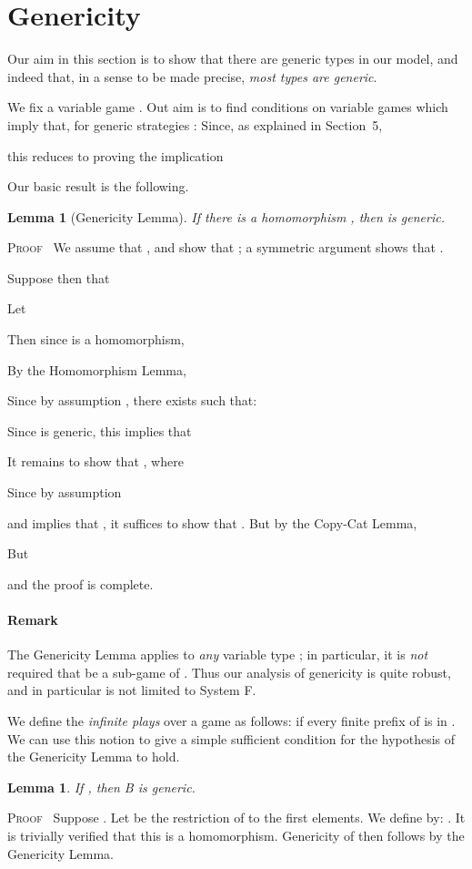 \documentclass[a4paper,11pt]{article}
\newtheorem{lemma}[proposition]{Lemma}
\newenvironment{proof}{\textsc{Proof}\ }{}
\begin{document}
\section{Genericity}

Our aim in this section is to show that there are generic types in our
model, and indeed that, in a sense to be made precise, \emph{most
  types are generic}.

We fix a variable game . Out aim is to find conditions
on variable games  which imply that, for generic strategies :
 Since, as
explained in Section~5,

this reduces to proving the implication

Our basic result is the following.

\begin{lemma}[Genericity Lemma]
\label{infgenericity}
If there is a homomorphism , then  is
generic.
\end{lemma}
\begin{proof}
We assume that , and show that
; a symmetric argument shows that .

\noindent Suppose then that

Let

Then since  is a homomorphism,

By the Homomorphism Lemma,

Since by assumption , there exists
 such that:

Since  is generic, this implies that

It remains to show that , where

Since by assumption

and  implies that ,
it suffices to show that .
But by the Copy-Cat Lemma,

But

and the proof is complete.
\end{proof}

\paragraph{Remark} The Genericity Lemma applies to \emph{any} variable
type ; in particular, it is \emph{not} required that  be a
sub-game of . Thus our analysis of genericity is quite robust,
and in particular is not limited to System F.

We define the \emph{infinite plays} over a game  as follows:
 if every finite prefix of  is in .
We can use this notion to give a simple sufficient condition for the
hypothesis of the Genericity Lemma to hold.
\begin{lemma}
If , then B is generic.
\end{lemma}
\begin{proof}
Suppose . Let  be the restriction of
 to the first  elements. We define 
by: . It is trivially verified that this is a
homomorphism. Genericity of  then follows by the Genericity Lemma.
\end{proof}
\end{document}
